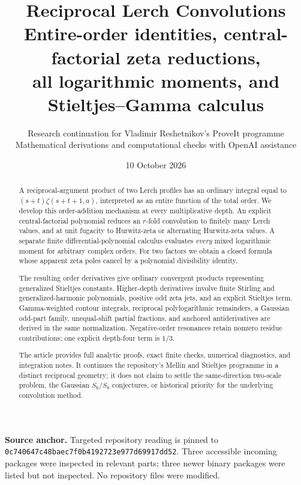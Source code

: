 \documentclass[11pt,a4paper]{article}
\title{\textbf{Reciprocal Lerch Convolutions}\\[6pt]
\large Entire-order identities, central-factorial zeta reductions,\\
all logarithmic moments, and Stieltjes--Gamma calculus}
\author{Research continuation for Vladimir Reshetnikov's ProveIt programme\\
\small Mathematical derivations and computational checks with OpenAI assistance}
\date{10 October 2026}
\numberwithin{equation}{section}
\theoremstyle{definition}\newtheorem{definition}[theorem]{Definition}
\theoremstyle{remark}\newtheorem{remark}[theorem]{Remark}
\newcommand{\src}[1]{\nolinkurl{#1}}
\newcommand{\pin}{\src{0c740647c48baec7f0b4192723e977d69917dd52}}
\begin{document}
\maketitle
\begin{abstract}
A reciprocal-argument product of two Lerch profiles has an ordinary
integral equal to $(s+t)\zeta(s+t+1,a)$, interpreted as an entire function
of the total order. We develop this order-addition mechanism at every
multiplicative depth. An explicit central-factorial polynomial reduces
an $r$-fold convolution to finitely many Lerch values, and at unit
fugacity to Hurwitz-zeta or alternating Hurwitz-zeta values. A separate
finite differential-polynomial calculus evaluates \emph{every} mixed
logarithmic moment for arbitrary complex orders. For two factors we
obtain a closed formula whose apparent zeta poles cancel by a polynomial
divisibility identity.

The resulting order derivatives give ordinary convergent products
representing generalized Stieltjes constants. Higher-depth derivatives
involve finite Stirling and generalized-harmonic polynomials, positive
odd zeta jets, and an explicit Stieltjes term. Gamma-weighted contour
integrals, reciprocal polylogarithmic remainders, a Gaussian odd-part
family, unequal-shift partial fractions, and anchored antiderivatives
are derived in the same normalization. Negative-order resonances retain
nonzero residue contributions; one explicit depth-four term is $1/3$.

The article provides full analytic proofs, exact finite checks, numerical
diagnostics, and integration notes. It continues the repository's
Mellin and Stieltjes programme in a distinct reciprocal geometry; it
does not claim to settle the same-direction two-scale problem, the
Gaussian $S_6/S_8$ conjectures, or historical priority for the underlying
convolution method.
\end{abstract}
\vfill
\noindent\small\textbf{Source anchor.} Targeted repository reading is pinned to\\
\pin. Three accessible incoming packages were inspected in relevant
parts; three newer binary packages were listed but not inspected.
No repository files were modified.\normalsize
\clearpage
\begingroup
\small
\tableofcontents
\endgroup
\clearpage













\end{document}
